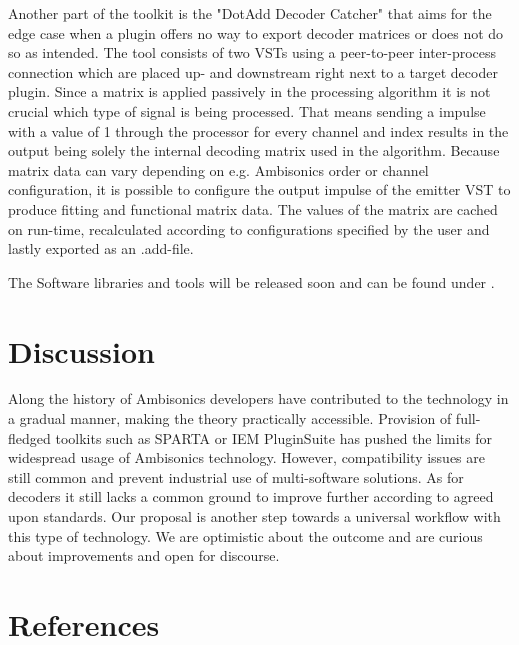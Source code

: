 \documentclass[a4paper, 10pt, twocolumn]{article}
\begin{document}
Another part of the toolkit is the "DotAdd Decoder Catcher" that aims for the edge case when a plugin offers no way to export decoder matrices or does not do so as intended. The tool consists of two VSTs using a peer-to-peer inter-process connection which are placed up- and downstream right next to a target decoder plugin. Since a matrix is applied passively in the processing algorithm it is not crucial which type of signal is being processed. That means sending a impulse with a value of 1 through the processor for every channel and index results in the output being solely the internal decoding matrix used in the algorithm. Because matrix data can vary depending on e.g. Ambisonics order or channel configuration, it is possible to configure the output impulse of the emitter VST to produce fitting and functional matrix data. The values of the matrix are cached on run-time, recalculated according to configurations specified by the user and lastly exported as an .add-file.


The Software libraries and tools will be released soon and can be found under \cite{dotadd}.


\section{Discussion}\label{sec:Discussion}

Along the history of Ambisonics developers have contributed to the technology in a gradual manner, making the theory practically accessible. Provision of full-fledged toolkits such as SPARTA or IEM PluginSuite has pushed the limits for widespread usage of Ambisonics technology. However, compatibility issues are still common and prevent industrial use of multi-software solutions. 
As for decoders it still lacks a common ground to improve further according to agreed upon standards. Our proposal is another step towards a universal workflow with this type of technology. We are optimistic about the outcome and are curious about improvements and open for discourse.



\renewcommand\refname{}
\section{References}\label{sec:References}

\begingroup
\RaggedRight 		%

\printbibliography
\endgroup
\end{document}
